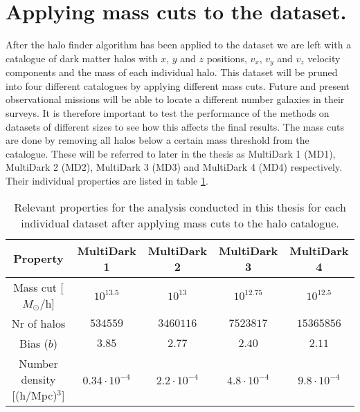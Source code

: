\section{Applying mass cuts to the dataset.}
After the halo finder algorithm has been applied to the dataset we are left with a catalogue of dark matter halos with $x$, $y$ and $z$ positions, $v_x$, $v_y$ and $v_z$ velocity components and the mass of each individual halo. This dataset will be pruned into four different catalogues by applying different mass cuts. Future and present observational missions will be able to locate a different number galaxies in their surveys. It is therefore important to test the performance of the methods on datasets of different sizes to see how this affects the final results. The mass cuts are done by removing all halos below a certain mass threshold from the catalogue. These will be referred to later in the thesis as MultiDark 1 (MD1), MultiDark 2 (MD2), MultiDark 3 (MD3) and MultiDark 4 (MD4) respectively. Their individual properties are listed in table \ref{tab:MDproperties}.
\begin{table}\label{tab:MDproperties}
    \begin{tabular}{| c | c | c | c | c | }
        \hline
        Property & MultiDark 1 & MultiDark 2 & MultiDark 3 & MultiDark 4 \\
        \hline
        Mass cut [$M_\odot$/h] & $10^{13.5}$ & $10^{13}$ & $10^{12.75}$ & $10^{12.5}$ \\ 
        Nr of halos &$534559$& $3460116$ & $7523817$& $15365856$ \\
        Bias ($b$) & $3.85$ & $2.77$ & $2.40$ & $2.11$ \\
        Number density [(h/Mpc)$^3$] & $0.34\cdot10^{-4}$ & $2.2\cdot10^{-4}$ & $4.8\cdot10^{-4}$ & $9.8\cdot10^{-4}$ \\
        \hline
    \end{tabular}
    \caption{Relevant properties for the analysis conducted in this thesis for each individual dataset after applying mass cuts to the halo catalogue.}
\end{table}
